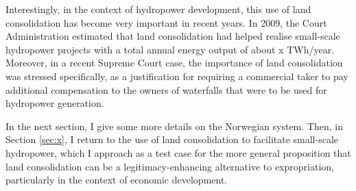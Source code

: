 Interestingly, in the context of hydropower development, this use of land consolidation has become very important in recent years. In 2009, the Court Administration estimated that land consolidation had helped realise small-scale hydropower projects with a total annual energy output of about x TWh/year. Moreover, in a recent Supreme Court case, the importance of land consolidation was stressed specifically, as a justification for requiring a commercial taker to pay additional compensation to the owners of waterfalls that were to be used for hydropower generation.

In the next section, I give some more details on the Norwegian system. Then, in Section \ref{sec:x}, I return to the use of land consolidation to facilitate small-scale hydropower, which I approach as a test case for the more general proposition that land consolidation can be a legitimacy-enhancing alternative to expropriation, particularly in the context of economic development.


